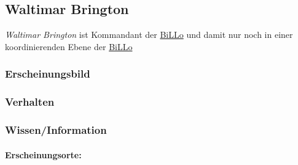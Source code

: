 \subsection{Waltimar Brington}
    \label{pers:waltimar-brington}
    \emph{Waltimar Brington} ist Kommandant der \hyperref[subsubsec:billo]{BiLLo} und damit nur noch in einer koordinierenden Ebene der \hyperref[subsubsec:billo]{BiLLo}
    \subsubsection{Erscheinungsbild}

    \subsubsection{Verhalten}

    \subsubsection{Wissen/Information}

    \paragraph{Erscheinungsorte:} 
